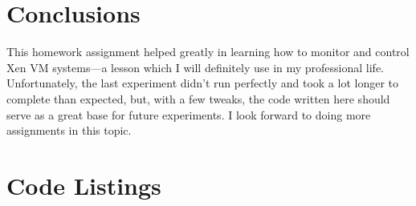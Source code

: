 \documentclass{article}
\begin{document}
  

\section{Conclusions}
  This homework assignment helped greatly in learning how to monitor and
  control Xen VM systems---a lesson which I will definitely use in my
  professional life. Unfortunately, the last experiment didn't run
  perfectly and took a lot longer to complete than expected, but, with a
  few tweaks, the code written here should serve as a great base for
  future experiments. I look forward to doing more assignments in this
  topic.

\appendix
\section{Code Listings}
\label{sec:appendix}
  

  
\end{document}
